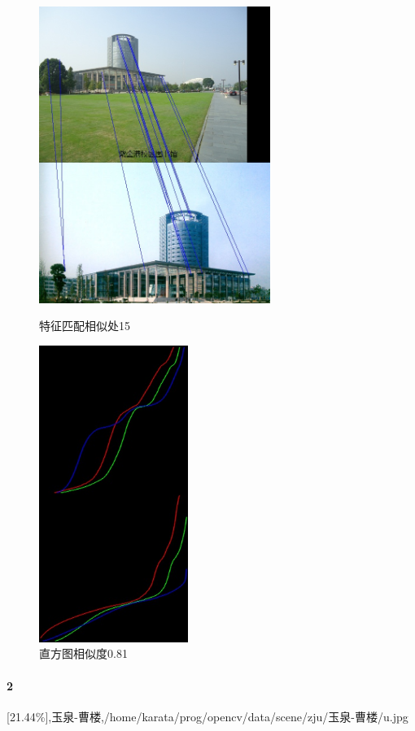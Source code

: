\begin{figure}[htb]
\begin{minipage}[t]{0.5\linewidth}
\centering
\includegraphics[height=3.8in]{紫金港图书馆.jpg.d/im1sift.jpg}
\caption{特征匹配相似处15}
\label{fig:side:a}
\end{minipage}%
\begin{minipage}[t]{0.5\linewidth}
\centering
\includegraphics[height=3.8in]{紫金港图书馆.jpg.d/im1hist2.jpg}
\caption{直方图相似度0.81}
\label{fig:side:a}
\end{minipage}%
\end{figure}

\clearpage
\paragraph{2}
[21.44\%],玉泉-曹楼,/home/karata/prog/opencv/data/scene/zju/玉泉-曹楼/u.jpg

